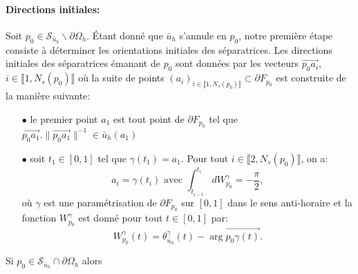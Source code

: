 \paragraph{Directions initiales:}

Soit $p_0\in\mathcal{S}_{\bar{u}_h}\backslash\partial\Omega_h$. Étant donné que $\bar{u}_h$ s'annule en $p_0$, notre première étape consiste à déterminer les orientations initiales des séparatrices. Les directions initiales des séparatrices émanant de $p_0$ sont données par les vecteurs $\overrightarrow{p_0a_i}$, $i\in\llbracket 1, N_s(p_0) \rrbracket$ où la suite de points $(a_i)_{i\in\llbracket 1, N_s(p_0)\rrbracket}\subset\partial F_{p_0}$ est construite de la manière suivante:\\
\begin{itemize}
    \item[$\bullet$] le premier point $a_1$ est tout point de $\partial F_{p_0}$ tel que $\overrightarrow{p_0a_1}.\|\overrightarrow{p_0a_1}\|^{-1}\in\bar{u}_h(a_1)$\\
    \item[$\bullet$] soit $t_1\in[0, 1]$ tel que $\gamma(t_1)=a_1$. Pour tout $i\in\llbracket 2, N_s(p_0)\rrbracket$, on a:
    $$
    a_i=\gamma(t_i)\mbox{ avec }\int_{t_{i-1}}^{t_i}dW_{p_0}^\gamma=-\frac{\pi}{2},
    $$
    où $\gamma$ est une paramétrisation de $\partial F_{p_0}$ sur $[0, 1]$ dans le sens anti-horaire et la fonction $W^\gamma_{p_0}$ est donné pour tout $t\in[0, 1]$ par:
    $$
    W_{p_0}^\gamma(t)=\theta^\gamma_{\bar{u}_h}(t)-\arg \overrightarrow{p_0\gamma(t)}.
    $$
\end{itemize}
Si $p_0\in\mathcal{S}_{\bar{u}_h}\cap\partial\Omega_h$ alors

